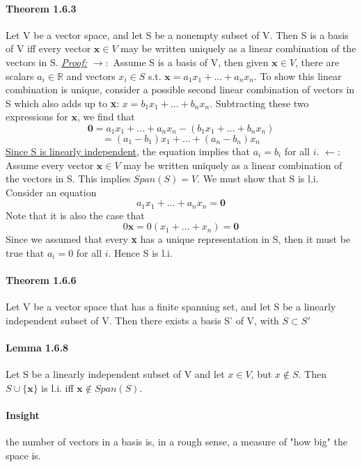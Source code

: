 \documentclass[11pt]{article}
\newcommand{\ti}[1]{\textit{#1}}
\newcommand{\tb}[1]{\textbf{#1}}
\newcommand{\mb}[1]{\mathbb{#1}}
\newcommand{\under}[1]{\underline{#1}}
\begin{document}
	\paragraph{Theorem 1.6.3} Let V be a vector space, and let S be a nonempty subset of V. Then S is a basis of V iff every vector $\tb{x} \in V$ may be written uniquely as a linear combination of the vectors in S. \newline
	\under{\ti{Proof:}}
	$\rightarrow:$ Assume  S is a basis of V, then given $\tb{x} \in V$, there are scalars $a_i \in \mb{R}$ and vectors $x_i \in S$ s.t. $\tb{x} = a_1x_1 + ... + a_nx_n$. To show this linear combination is unique, consider a possible second linear combination of vectors in S which also adds up to \tb{x}: $x= b_1x_1 + ...+b_nx_n$. Subtracting these two expressions for $\tb{x}$, we find that
	$$\tb{0} = a_1x_1 + ... + a_nx_n - (b_1x_1 + ...+b_nx_n)$$ 
	$$=(a_1 - b_1)x_1 + ...+(a_n-b_n)x_n$$
	\under{Since S is linearly independent}, the equation implies that $a_i = b_i$ for all $i$.\newline\newline
	$\leftarrow$: Assume every vector $\tb{x} \in V$ may be written uniquely as a linear combination of the vectors in S. This implies $Span(S) = V$. We must show that S is l.i. Consider an equation
	$$a_1x_1 +...+a_nx_n = \tb{0}$$
	Note that it is also the case that
	$$0\tb{x} = 0(x_1 + ...+x_n) = \tb{0}$$
	Since we assumed that every \tb{x} has a unique representation in S, then it must be true that $a_i = 0$ for all $i$. Hence S is l.i.
 	\paragraph{Theorem 1.6.6} Let V be a vector space that has a finite spanning set, and let S be a linearly independent subset of V. Then there exists a basis S' of V, with $S \subset S'$
	\paragraph{Lemma 1.6.8} Let S be a linearly independent subset of V and let $x \in V$, but $x \notin S$. Then $S \cup \{\tb{x}\}$ is l.i. iff $\tb{x} \notin Span(S)$.
	\paragraph{Insight} the number of vectors in a basis is, in a rough sense, a measure of "how big" the space is.
\end{document}
